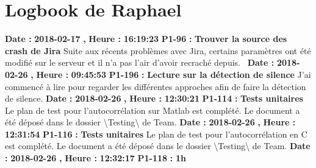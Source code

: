 \documentclass{article}%
\begin{document}
\section{Logbook de Raphael}%
\textbf{Date : }%
\textbf{2018{-}02{-}17}%
\textbf{,}%
\textbf{ Heure : }%
\textbf{16:19:23}%
\newline%
%
\textbf{P1{-}96 }%
\textbf{ : }%
\textbf{ Trouver la source des crash de Jira}%
\newline%
\newline%
%
Suite aux récents problèmes avec Jira, certains paramètres ont été modifié sur le serveur et il n'a pas l'air d'avoir recraché depuis.~\newline%
\newline%
%
\textbf{Date : }%
\textbf{2018{-}02{-}26}%
\textbf{,}%
\textbf{ Heure : }%
\textbf{09:45:53}%
\newline%
%
\textbf{P1{-}196 }%
\textbf{ : }%
\textbf{ Lecture sur la détection de silence}%
\newline%
\newline%
%
J'ai commencé à lire pour regarder les différentes approches afin de faire la détection de silence.\newline%
\newline%
%
\textbf{Date : }%
\textbf{2018{-}02{-}26}%
\textbf{,}%
\textbf{ Heure : }%
\textbf{12:30:21}%
\newline%
%
\textbf{P1{-}114 }%
\textbf{ : }%
\textbf{ Tests unitaires}%
\newline%
\newline%
%
Le plan de test pour l'autocorrélation sur Matlab est complété. Le document a été déposé dans le dossier \textbackslash{}Testing\textbackslash{} de Team.\newline%
\newline%
%
\textbf{Date : }%
\textbf{2018{-}02{-}26}%
\textbf{,}%
\textbf{ Heure : }%
\textbf{12:31:54}%
\newline%
%
\textbf{P1{-}116 }%
\textbf{ : }%
\textbf{ Tests unitaires}%
\newline%
\newline%
%
Le plan de test pour l'autocorrélation en C est complété. Le document a été déposé dans le dossier \textbackslash{}Testing\textbackslash{} de Team.\newline%
\newline%
%
\textbf{Date : }%
\textbf{2018{-}02{-}26}%
\textbf{,}%
\textbf{ Heure : }%
\textbf{12:32:17}%
\newline%
%
\textbf{P1{-}118 }%
\textbf{ : }%
\textbf{ 1h}%
\end{document}

